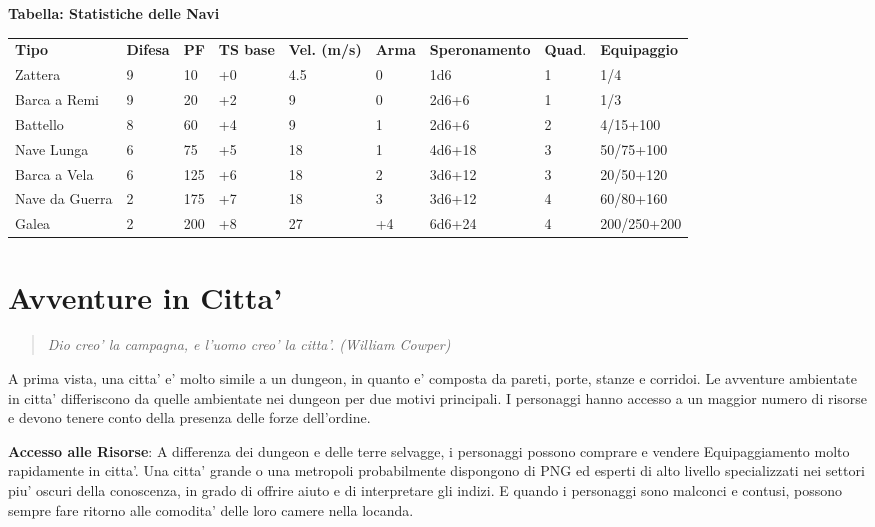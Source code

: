 \documentclass[a4paper,11pt,twoside,openany]{book}
\begin{document}
{		\bigskip
		
		\textbf{Tabella: Statistiche delle Navi}
		
		\medskip
		
		\begin{tabular}{L{2cm} L{1cm} L{1cm} L{1cm} L{1.5cm} L{1cm} L{2cm} L{1cm} L{2cm}}
			\toprule
			\textbf{Tipo} & \textbf{Difesa} & \textbf{PF} & \textbf{TS base} & \textbf{Vel. (m/s)} & \textbf{Arma} & \textbf{Speronamento} & \textbf{Quad}. & \textbf{Equipaggio}\tabularnewline
			Zattera & 9 & 10 & +0 & 4.5 & 0 & 1d6 & 1 & 1/4\tabularnewline
			Barca a Remi & 9 & 20 & +2 & 9 & 0 & 2d6+6 & 1 & 1/3\tabularnewline
			Battello & 8 & 60 & +4 & 9 & 1 & 2d6+6 & 2 & 4/15+100\tabularnewline
			Nave Lunga & 6 & 75 & +5 & 18 & 1 & 4d6+18 & 3 & 50/75+100\tabularnewline
			Barca a Vela & 6 & 125 & +6 & 18 & 2 & 3d6+12 & 3 & 20/50+120\tabularnewline
			Nave da Guerra & 2 & 175 & +7 & 18 & 3 & 3d6+12 & 4 & 60/80+160\tabularnewline
			Galea & 2 & 200 & +8 & 27 & +4 & 6d6+24 & 4 & 200/250+200\tabularnewline
		\end{tabular}
		
		\pagebreak
		
		\section{Avventure in Citta'}
		
		\label{avventure-in-citta}
		\begin{quote}\textit{
				Dio creo' la campagna, e l'uomo creo' la citta'. (William Cowper)
		}\end{quote}
		
		A prima vista, una citta' e' molto simile a un dungeon, in quanto e' composta da pareti, porte, stanze e corridoi. Le avventure ambientate in citta' differiscono da quelle ambientate nei dungeon per due motivi principali. I personaggi hanno accesso a un maggior numero di risorse e devono tenere conto della presenza delle forze dell'ordine.
		
		\textbf{Accesso alle Risorse}: A differenza dei dungeon e delle terre selvagge, i personaggi possono comprare e vendere Equipaggiamento molto rapidamente in citta'. Una citta' grande o una metropoli probabilmente dispongono di PNG ed esperti di alto livello specializzati nei settori piu' oscuri della conoscenza, in grado di offrire aiuto e di interpretare gli indizi. E quando i personaggi sono malconci e contusi, possono sempre fare ritorno alle comodita' delle loro camere nella locanda.
		
}
\end{document}
